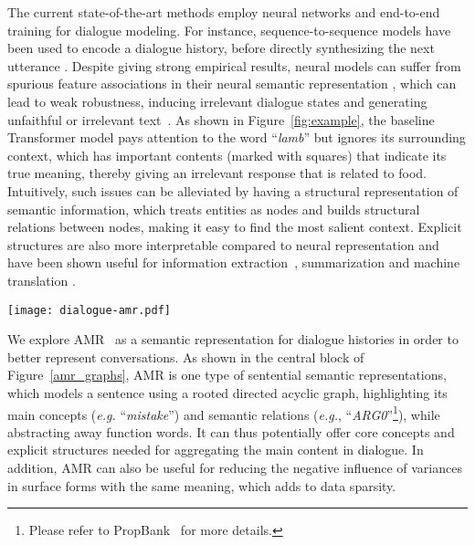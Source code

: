 \documentclass[11pt,a4paper]{article}
\begin{document}
The current state-of-the-art methods employ neural networks and end-to-end training \citep{Sutskever14,BahdanauCB14} for dialogue modeling.
For instance, sequence-to-sequence models have been used to encode a dialogue history, before directly synthesizing the next utterance \citep{VinyalsL15, wen-etal-2017-network,bao-etal-2020-plato}. 
Despite giving strong empirical results, neural models can suffer from spurious feature associations in their neural semantic representation \cite{poliak-etal-2018-hypothesis,kaushik2020learning}, which can lead to weak robustness, inducing irrelevant dialogue states \cite{Xu2014SLU,sharma-etal-2019-improving,rastogi-etal-2019-scaling} and generating unfaithful or irrelevant text~\cite{maynez2020faithfulness,niu2020avgout}.
As shown in Figure~\ref{fig:example}, the baseline Transformer model pays attention to the word ``\textit{lamb}'' but ignores its surrounding context, which has important contents (marked with squares) that indicate its true meaning, thereby giving an irrelevant response that is related to food.
Intuitively, such issues can be alleviated by having a structural representation of semantic information, which treats entities as nodes and builds structural relations between nodes, making it easy to find the most salient context. 
Explicit structures are also more interpretable compared to neural representation and have been shown useful for information extraction~\cite{StrubellVAWM18,sun-etal-2019-aspect,Li20LocalAttention,bai21syntax,SachanZQH21}, summarization \cite{liu-etal-2015-toward,hardy-vlachos-2018-guided,liao2018abstract} and machine translation \cite{marcheggiani-etal-2018-exploiting,song2019semantic}.





\begin{figure*}[!t]
	\centering
	\texttt{[image: dialogue-amr.pdf]}
	\caption{Dialogue AMR graph construction process. Step 1: parse raw-text utterance into utterance AMR graphs; Step 2: connect utterance AMR graphs into a dialogue AMR graph.}
	\label{amr_graphs}
\end{figure*}

We explore AMR~\cite{banarescu2013abstract} as a semantic representation for dialogue histories in order to better represent conversations.
As shown in the central block of Figure~\ref{amr_graphs}, AMR is one type of sentential semantic representations, which models a sentence using a rooted directed acyclic graph, highlighting its main concepts (\emph{e.g.} ``\textit{mistake}'') and semantic relations (\emph{e.g.}, ``\textit{ARG0}''\footnote{Please refer to PropBank~\cite{KingsburyP02,PalmerKG05} for more details.}), while abstracting away function words.
It can thus potentially offer core concepts and explicit structures needed for aggregating the main content in dialogue.
In addition, AMR can also be useful for reducing the negative influence of variances in surface forms with the same meaning, which adds to data sparsity. 
\end{document}

